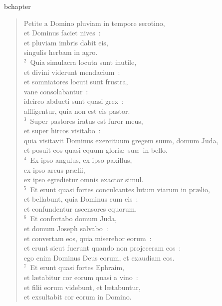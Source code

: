 bchapter\begin{flushleft}\begin{verse}\vspace{-19pt}\hspace{6pt}Petite a Domino pluviam in tempore serotino,\\\hspace{6pt} et Dominus faciet nives~:\\ et pluviam imbris dabit eis,\\ singulis herbam in agro.\\
${}^{2}$~Quia simulacra locuta sunt inutile,\\ et divini viderunt mendacium~:\\ et somniatores locuti sunt frustra,\\ vane consolabantur~:\\ idcirco abducti sunt quasi grex~:\\ affligentur, quia non est eis pastor.\\
${}^{3}$~Super pastores iratus est furor meus,\\ et super hircos visitabo~:\\ quia visitavit Dominus exercituum gregem suum, domum Juda,\\ et posuit eos quasi equum glori\ae\ su\ae\ in bello.\\
${}^{4}$~Ex ipso angulus, ex ipso paxillus,\\ ex ipso arcus pr\ae lii,\\ ex ipso egredietur omnis exactor simul.\\
${}^{5}$~Et erunt quasi fortes conculcantes lutum viarum in pr\ae lio,\\ et bellabunt, quia Dominus cum eis~:\\ et confundentur ascensores equorum.\\
${}^{6}$~Et confortabo domum Juda,\\ et domum Joseph salvabo~:\\ et convertam eos, quia miserebor eorum~:\\ et erunt sicut fuerunt quando non projeceram eos~:\\ ego enim Dominus Deus eorum, et exaudiam eos.\\
${}^{7}$~Et erunt quasi fortes Ephraim,\\ et l\ae tabitur cor eorum quasi a vino~:\\ et filii eorum videbunt, et l\ae tabuntur,\\ et exsultabit cor eorum in Domino.\\

\end{verse}
\end{flushleft}
